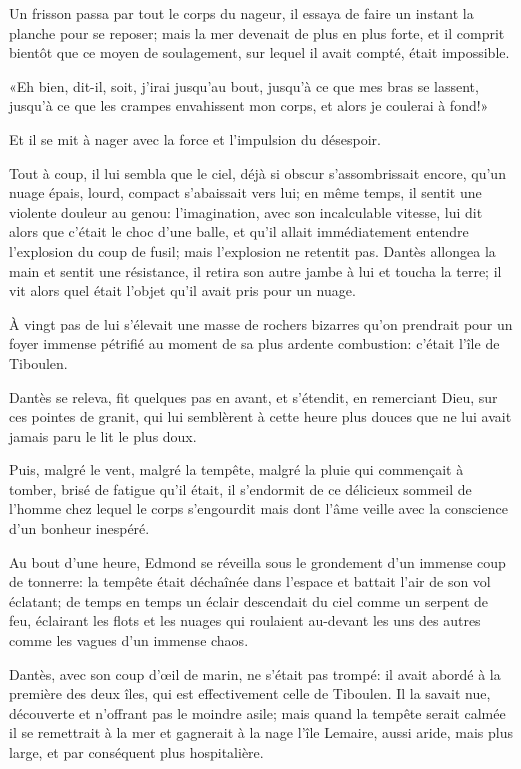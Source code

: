 Un frisson passa par tout le corps du nageur, il essaya de faire un instant la planche pour se reposer; mais la mer devenait de plus en plus forte, et il comprit bientôt que ce moyen de soulagement, sur lequel il avait compté, était impossible.

«Eh bien, dit-il, soit, j'irai jusqu'au bout, jusqu'à ce que mes bras se lassent, jusqu'à ce que les crampes envahissent mon corps, et alors je coulerai à fond!»

Et il se mit à nager avec la force et l'impulsion du désespoir.

Tout à coup, il lui sembla que le ciel, déjà si obscur s'assombrissait encore, qu'un nuage épais, lourd, compact s'abaissait vers lui; en même temps, il sentit une violente douleur au genou: l'imagination, avec son incalculable vitesse, lui dit alors que c'était le choc d'une balle, et qu'il allait immédiatement entendre l'explosion du coup de fusil; mais l'explosion ne retentit pas. Dantès allongea la main et sentit une résistance, il retira son autre jambe à lui et toucha la terre; il vit alors quel était l'objet qu'il avait pris pour un nuage.

À vingt pas de lui s'élevait une masse de rochers bizarres qu'on prendrait pour un foyer immense pétrifié au moment de sa plus ardente combustion: c'était l'île de Tiboulen.

Dantès se releva, fit quelques pas en avant, et s'étendit, en remerciant Dieu, sur ces pointes de granit, qui lui semblèrent à cette heure plus douces que ne lui avait jamais paru le lit le plus doux.

Puis, malgré le vent, malgré la tempête, malgré la pluie qui commençait à tomber, brisé de fatigue qu'il était, il s'endormit de ce délicieux sommeil de l'homme chez lequel le corps s'engourdit mais dont l'âme veille avec la conscience d'un bonheur inespéré.

Au bout d'une heure, Edmond se réveilla sous le grondement d'un immense coup de tonnerre: la tempête était déchaînée dans l'espace et battait l'air de son vol éclatant; de temps en temps un éclair descendait du ciel comme un serpent de feu, éclairant les flots et les nuages qui roulaient au-devant les uns des autres comme les vagues d'un immense chaos.

Dantès, avec son coup d'œil de marin, ne s'était pas trompé: il avait abordé à la première des deux îles, qui est effectivement celle de Tiboulen. Il la savait nue, découverte et n'offrant pas le moindre asile; mais quand la tempête serait calmée il se remettrait à la mer et gagnerait à la nage l'île Lemaire, aussi aride, mais plus large, et par conséquent plus hospitalière.

